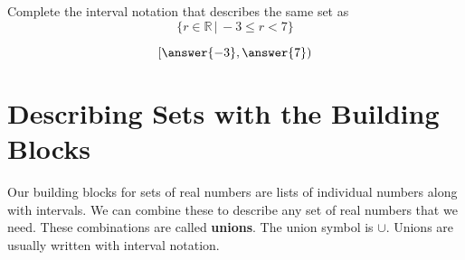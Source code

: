 \documentclass{ximera}
\begin{document}
\begin{question}
Complete the interval notation that describes the same set as 
\[ \{ r \in \mathbb {R} \, | \, -3 \leq r < 7 \} \]

\[
\left [ \answer{-3} , \answer{7} \right )
\]



\end{question}




















\section{Describing Sets with the Building Blocks}

Our building blocks for sets of real numbers are lists of individual numbers along with intervals.  We can combine these to describe any set of real numbers that we need.  These combinations are called \textbf{unions}.  The union symbol is $\cup$. Unions are usually written with interval notation.
\end{document}
